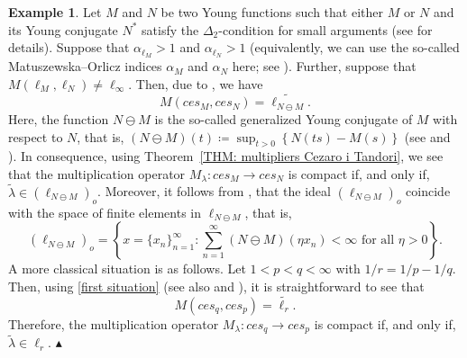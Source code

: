 \documentclass[11pt]{amsart}
\theoremstyle{definition}
\theoremstyle{definition}
\theoremstyle{definition}
\theoremstyle{definition}
\theoremstyle{definition}
\theoremstyle{definition}
\theoremstyle{definition}
\newtheorem{example}[theorem]{Example}
\theoremstyle{definition}
\numberwithin{equation}{section}
\numberwithin{equation}{section}
\numberwithin{equation}{section}
\theoremstyle{definition}
\theoremstyle{definition}
\theoremstyle{definition}
\theoremstyle{definition}
\theoremstyle{definition}
\theoremstyle{definition}
\newcommand\xqed[1]{%
	\leavevmode\unskip\penalty9999 \hbox{}\nobreak\hfill
	\quad\hbox{#1}}
\newcommand\demo{\xqed{{\Large $\blacktriangle$}}}
\begin{document}
\begin{example} \label{EXAMPLE: compact cesp -> cesq faktoryzacja}
	Let $M$ and $N$ be two Young functions such that either $M$ or $N$ and its Young conjugate $N^*$
	satisfy the $\Delta_2$-condition for small arguments (see \cite{Mal83} for details).
	Suppose that $\alpha_{\ell_M} > 1$ and $\alpha_{\ell_N} > 1$ (equivalently, we can use the so-called
	Matuszewska--Orlicz indices $\alpha_M$ and $\alpha_N$ here; see \cite[Proposition~2.b.5, p.~139]{LT79}).
	Further, suppose that $M(\ell_M,\ell_N) \neq \ell_{\infty}$.
	Then, due to \cite[Example~6.b.2]{KT24}, we have
	\begin{equation} \label{first situation}
		M(ces_M,ces_N) = \widetilde{\ell_{N \ominus M}}.
	\end{equation}
	Here, the function $N \ominus M$ is the so-called generalized Young conjugate of $M$ with respect to $N$, that is,
	$(N \ominus M)(t) \coloneqq \sup_{t > 0} \left\{ N(ts) - M(s) \right\}$ (see \cite{DR00} and \cite{LT21}).
	In consequence, using Theorem~\ref{THM: multipliers Cezaro i Tandori}, we see that the multiplication operator
	$M_{\lambda} \colon ces_M \rightarrow ces_N$ is compact if, and only if, $\widetilde{\lambda} \in (\ell_{N \ominus M})_o$.
	Moreover, it follows from \cite[Theorem~3.3(a), p.~17]{Mal83}, that the ideal $(\ell_{N \ominus M})_o$ coincide
	with the space of finite elements in $\ell_{N \ominus M}$, that is,
	\begin{equation*}
		(\ell_{N \ominus M})_o
			= \left\{ x = \{x_n\}_{n=1}^{\infty} \colon \sum_{n=1}^{\infty} (N \ominus M)(\eta x_n) < \infty \text{ for all } \eta > 0 \right\}.
	\end{equation*}
	A more classical situation is as follows. Let $1 < p < q < \infty$ with $1/r = 1/p - 1/q$.
	Then, using \eqref{first situation} (see also \cite[p.~69]{Ben96} and \cite[Corollary~6.b.4]{KT24}), it is straightforward to see that
	\begin{equation*}
		M(ces_q, ces_p) = \widetilde{\ell_r}.
	\end{equation*}
	Therefore, the multiplication operator $M_{\lambda} \colon ces_q \rightarrow ces_p$ is compact if, and only if, $\widetilde{\lambda} \in \ell_r$.
	\demo
\end{example}
\end{document}
